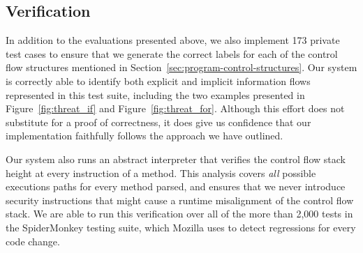 \begin{comment}
\begin{figure}[htp]
  \centerline{\texttt{[image: graphics/evaluation\_falsepositives.pdf]}}
  \caption{Information flow alarms triggered when browsing Alexa's Top Sites in the United States~\cite{alexa}.}
  \label{fig:eval_falsepositives}
\end{figure}
\end{comment}

\subsection{Verification}

In addition to the evaluations presented above, we also implement 173 private test cases to ensure that we generate the correct labels for each of the control flow structures mentioned in Section~\ref{sec:program-control-structures}.
Our system is correctly able to identify both explicit and implicit information flows represented in this test suite, including the two examples presented in Figure~\ref{fig:threat_if} and Figure~\ref{fig:threat_for}.
Although this effort does not substitute for a proof of correctness, it does give us confidence that our implementation faithfully follows the approach we have outlined.

Our system also runs an abstract interpreter that verifies the control flow stack height at every instruction of a method.
This analysis covers \emph{all} possible executions paths for every method parsed, and ensures that we never introduce security instructions that might cause a runtime misalignment of the control flow stack.
We are able to run this verification over all of the more than 2,000 tests in the SpiderMonkey testing suite, which Mozilla uses to detect regressions for every code change.





